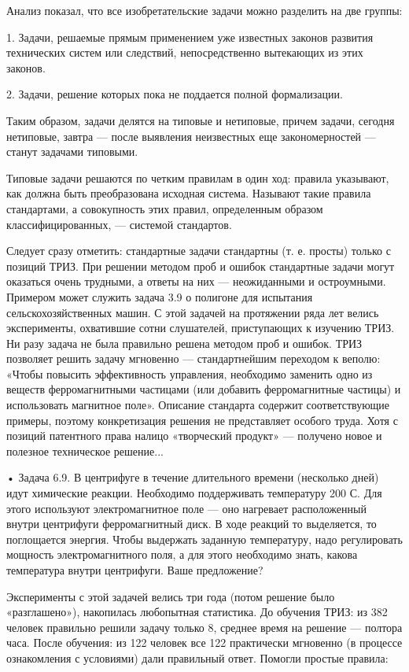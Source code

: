 Анализ показал, что все изобретательские задачи можно разделить на две
группы:


1. Задачи, решаемые прямым  применением уже известных законов развития
технических систем  или следствий, непосредственно вытекающих  из этих
законов.

2. Задачи, решение которых пока не поддается полной формализации.

Таким  образом,   задачи  делятся  на  типовые   и  нетиповые,  причем
задачи, сегодня  нетиповые, завтра  — после выявления  неизвестных еще
закономерностей — станут задачами типовыми.

Типовые  задачи  решаются  по  четким правилам  в  один  ход:  правила
указывают, как  должна быть  преобразована исходная  система. Называют
такие правила  стандартами, а  совокупность этих  правил, определенным
образом классифицированных, — системой стандартов.

Следует  сразу   отметить:  стандартные   задачи  стандартны   (т.  е.
просты)  только с  позиций ТРИЗ.  При  решении методом  проб и  ошибок
стандартные задачи могут  оказаться очень трудными, а ответы  на них —
неожиданными  и  остроумными.  Примером  может служить  задача  3.9  о
полигоне для  испытания сельскохозяйственных машин. С  этой задачей на
протяжении ряда лет велись  эксперименты, охватившие сотни слушателей,
приступающих к изучению ТРИЗ. Ни  разу задача не была правильно решена
методом  проб  и ошибок.  ТРИЗ  позволяет  решить задачу  мгновенно  —
стандартнейшим  переходом  к  веполю:  «Чтобы  повысить  эффективность
управления,  необходимо  заменить   одно  из  веществ  ферромагнитными
частицами  (или   добавить  ферромагнитные  частицы)   и  использовать
магнитное поле». Описание  стандарта содержит соответствующие примеры,
поэтому конкретизация  решения не  представляет особого труда.  Хотя с
позиций патентного права налицо  «творческий продукт» — получено новое
и полезное техническое решение...


• Задача  6.9. В центрифуге  в течение длительного  времени (несколько
дней) идут химические реакции. Необходимо поддерживать температуру 200
С.  Для  этого  используют  электромагнитное  поле  —  оно  нагревает
расположенный внутри  центрифуги ферромагнитный  диск. В  ходе реакций
то  выделяется,  то  поглощается  энергия.  Чтобы  выдержать  заданную
температуру, надо регулировать мощность  электромагнитного поля, а для
этого  необходимо знать,  какова температура  внутри центрифуги.  Ваше
предложение?

Эксперименты  с  этой задачей  велись  три  года (потом  решение  было
«разглашено»), накопилась любопытная статистика.  До обучения ТРИЗ: из
382 человек правильно решили задачу только 8, среднее время на решение
— полтора  часа. После  обучения: из 122  человек все  122 практически
мгновенно (в процессе ознакомления с условиями) дали правильный ответ.
Помогли простые правила:


